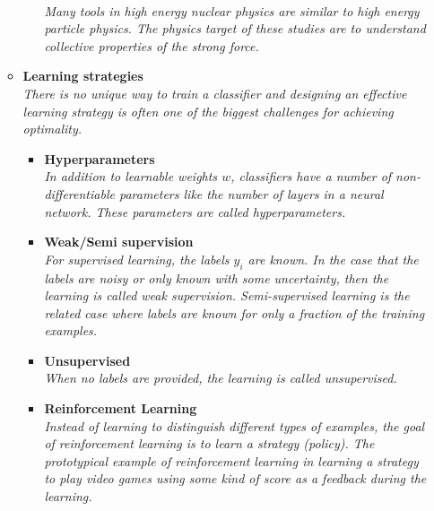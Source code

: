 \documentclass[12pt,letterpaper]{article}
\begin{document}
\begin{itemize}
\begin{itemize}
\begin{itemize}
			\\\textit{Many tools in high energy nuclear physics are similar to high energy particle physics.  The physics target of these studies are to understand collective properties of the strong force.}
		\end{itemize}
		\item \textbf{Learning strategies}
		\\\textit{There is no unique way to train a classifier and designing an effective learning strategy is often one of the biggest challenges for achieving optimality.}
			\begin{itemize}
				\item \textbf{Hyperparameters}~\cite{Tani:2020dyi,Dudko:2021cie,Bevan:2017stx,DeZoort:2023dvb}
				\\\textit{In addition to learnable weights $w$, classifiers have a number of non-differentiable parameters like the number of layers in a neural network.  These parameters are called hyperparameters.}
				\item \textbf{Weak/Semi supervision}~\cite{Dery:2017fap,Metodiev:2017vrx,Komiske:2018oaa,Collins:2018epr,Collins:2019jip,Borisyak:2019vbz,Cohen:2017exh,Komiske:2018vkc,Metodiev:2018ftz,collaboration2020dijet,Amram:2020ykb,Brewer:2020och,Dahbi:2020zjw,Lee:2019ssx,Lieberman:2021krq,Komiske:2022vxg,Li:2022omf,Finke:2022lsu,LeBlanc:2022bwd,Dolan:2022ikg,Bardhan:2023mia}
				\\\textit{For supervised learning, the labels $y_i$ are known.  In the case that the labels are noisy or only known with some uncertainty, then the learning is called weak supervision.  Semi-supervised learning is the related case where labels are known for only a fraction of the training examples.}
				\item \textbf{Unsupervised}~\cite{Mackey:2015hwa,Komiske:2019fks,1797846,Dillon:2019cqt,Cai:2020vzx,Howard:2021pos,Dillon:2021gag}
				\\\textit{When no labels are provided, the learning is called unsupervised.}
				\item \textbf{Reinforcement Learning}~\cite{Carrazza:2019efs,Brehmer:2020brs,John:2020sak,Harvey:2021oue,Cranmer:2021gdt,Windisch:2021mem,Dersy:2022bym,Nishimura:2023wdu}
				\\\textit{Instead of learning to distinguish different types of examples, the goal of reinforcement learning is to learn a strategy (policy).  The prototypical example of reinforcement learning in learning a strategy to play video games using some kind of score as a feedback during the learning.}

\end{itemize}
\end{itemize}
\end{itemize}
\end{document}
